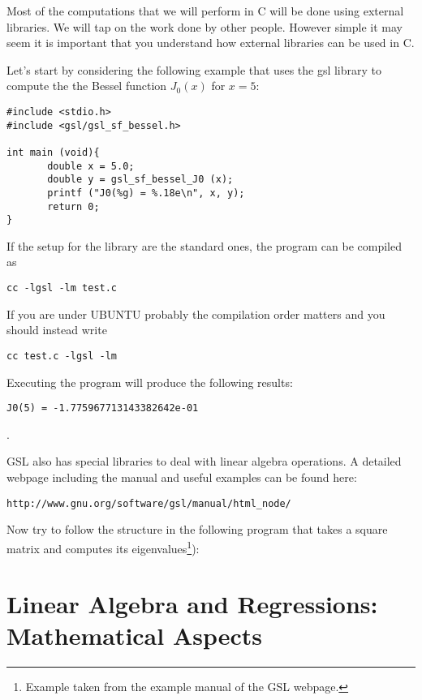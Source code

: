 \documentclass{article}
\begin{document}
Most of the computations that we will perform in C will be done using external libraries. We will tap on the work done by other people. However simple it may seem it is important that you understand how external libraries can be used in C.

Let's start by considering the following example that uses the gsl library to compute the the Bessel function $J_{0}(x)$ for $x=5$:

\begin{verbatim}
#include <stdio.h>
#include <gsl/gsl_sf_bessel.h>
     
int main (void){
       double x = 5.0;
       double y = gsl_sf_bessel_J0 (x);
       printf ("J0(%g) = %.18e\n", x, y);
       return 0;
}
\end{verbatim}

If the setup for the library are the standard ones, the program can be compiled as

\begin{verbatim}
cc -lgsl -lm test.c 
\end{verbatim}



If you are under UBUNTU probably the compilation order matters and you should instead write

\begin{verbatim}
cc test.c -lgsl -lm 
\end{verbatim}

Executing the program will produce the following results:

\begin{verbatim}
J0(5) = -1.775967713143382642e-01
\end{verbatim}.


GSL also has special libraries to deal with linear algebra operations. A detailed webpage including the manual and useful examples can be found here:

\begin{verbatim}
http://www.gnu.org/software/gsl/manual/html_node/
\end{verbatim}

Now try to follow the structure in the following program that takes a square matrix and computes its eigenvalues\footnote{Example taken from the example manual of the GSL webpage.}):




\section{Linear Algebra and Regressions: Mathematical Aspects}
\end{document}
